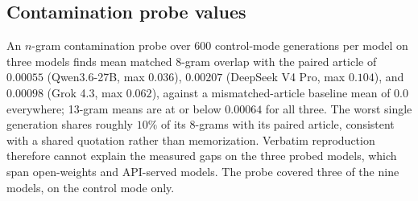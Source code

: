 \documentclass{article}
\begin{document}
\subsection{Contamination probe values}
An $n$-gram contamination probe over $600$ control-mode generations per model on three models
finds mean matched 8-gram overlap with the paired article of $0.00055$ (Qwen3.6-27B, max
$0.036$), $0.00207$ (DeepSeek V4 Pro, max $0.104$), and $0.00098$ (Grok 4.3, max $0.062$),
against a mismatched-article baseline mean of $0.0$ everywhere; 13-gram means are at or below
$0.00064$ for all three. The worst single generation shares roughly $10\%$ of its 8-grams with
its paired article, consistent with a shared quotation rather than memorization. Verbatim
reproduction therefore cannot explain the measured gaps on the three probed models, which
span open-weights and API-served models. The probe covered three of the nine models, on the
control mode only.
\end{document}
